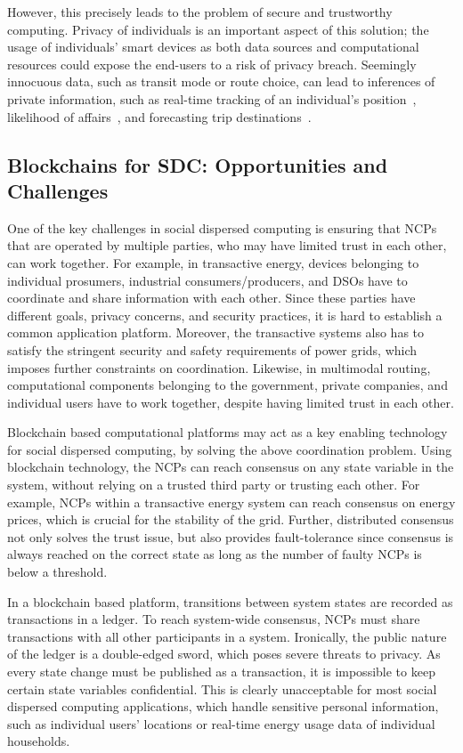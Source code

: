 \documentclass[12pt,letterpaper]{article}
\begin{document}
However, this precisely leads to the problem of secure and trustworthy computing.  Privacy of individuals is an important aspect of this solution; the usage of individuals' smart devices as both data sources and computational resources  could expose the end-users to a risk of privacy breach. Seemingly innocuous data, such as transit mode or route choice, can lead to inferences of
private information, such as real-time tracking of an individual's position~\cite{koufogiannis:2015aa}, likelihood of affairs~\cite{mueffelmann:2015aa}, and forecasting trip destinations~\cite{dewri:2013aa}.

\subsection{Blockchains for SDC: Opportunities and Challenges}

One of the key challenges in social dispersed computing is ensuring that NCPs that are operated by multiple parties, who may have limited trust in each other, can work together.
For example, in transactive energy, devices belonging to individual prosumers, industrial consumers/producers, and DSOs have to coordinate and share information with each other.
Since these parties have different goals, privacy concerns, and security practices, it is hard to establish a common application platform.
Moreover, the transactive systems also has to satisfy the stringent security and safety requirements of power grids, which imposes further constraints on coordination.  
Likewise, in multimodal routing, computational components belonging to the government, private companies, and individual users have to work together, despite having limited trust in each other.

Blockchain based computational platforms may act as a key enabling technology for social dispersed computing, by solving the above coordination problem.
Using blockchain technology, the NCPs can reach consensus on any state variable in the system, without relying on a trusted third party or trusting each other.
For example, NCPs within a transactive energy system can reach consensus on energy prices, which is crucial for the stability of the grid.
Further, distributed consensus not only solves the trust issue, but also provides fault-tolerance since consensus is always reached on the correct state as long as the number of faulty NCPs is below a threshold.

In a blockchain based platform, transitions between system states are recorded as transactions in a ledger.
To reach system-wide consensus, NCPs must share transactions with all other participants in a system.
Ironically, the public nature of the ledger is a double-edged sword, which poses severe threats to privacy.
As every state change must be published as a transaction, it is impossible to keep certain state variables confidential.
This is clearly unacceptable for most social dispersed computing applications, which handle sensitive personal information, such as individual users' locations or real-time energy usage data of individual households.
\end{document}
